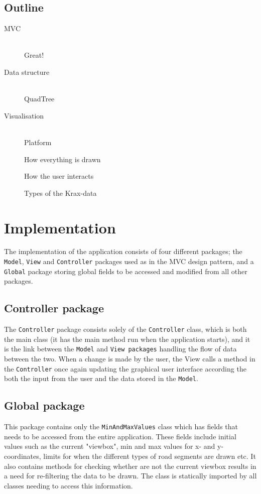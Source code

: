 \documentclass[a4paper,11pt]{article}
\begin{document}
\subsection{Outline}
\begin{description}
	\item[MVC] \hfill \\
	Great!
	\item[Data structure] \hfill \\
	QuadTree
	\item[Visualisation] \hfill \\
	Platform
	
	How everything is drawn
	
	How the user interacts
	
	Types of the Krax-data
\end{description}

\pagebreak
\section{Implementation} %
\label{sec:Implementation} %
The implementation of the application consists of four different packages; the \texttt{Model}, \texttt{View} and \texttt{Controller} packages used as in the MVC design pattern, and a \texttt{Global} package storing global fields to be accessed and modified from all other packages.


\subsection{Controller package} %
The \texttt{Controller} package consists solely of the \texttt{Controller} class, which is both the main class (it has the main method run when the application starts), and it is the link between the \texttt{Model} and \texttt{View packages} handling the flow of data between the two. When a change is made by the user, the View calls a method in the \texttt{Controller} once again updating the graphical user interface according the both the input from the user and the data stored in the \texttt{Model}.

\subsection{Global package} %
This package contains only the \texttt{MinAndMaxValues} class which has fields that needs to be accessed from the entire application. These fields include initial values such as the current "viewbox", min and max values for x- and y-coordinates, limits for when the different types of road segments are drawn etc. It also contains methods for checking whether are not the current viewbox results in a need for re-filtering the data to be drawn. The class is statically imported by all classes needing to access this information.
\end{document}
